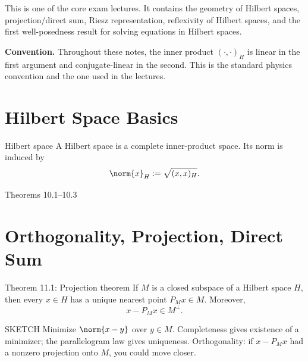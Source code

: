 \documentclass[header={Lecture 8 Exam Study Notes}]{study-note}
\begin{document}

\vspace{0.8em}

\begin{focusbox}
This is one of the core exam lectures. It contains the geometry of Hilbert spaces, projection/direct sum, Riesz representation, reflexivity of Hilbert spaces, and the first well-posedness result for solving equations in Hilbert spaces.

\medskip

\textbf{Convention.} Throughout these notes, the inner product $(\cdot,\cdot)_H$ is linear in the first argument and conjugate-linear in the second. This is the standard physics convention and the one used in the lectures.
\end{focusbox}

\tableofcontents

\section{Hilbert Space Basics}

\begin{defbox}{Hilbert space}
A Hilbert space is a complete inner-product space. Its norm is induced by
\[
\norm{x}_H:=\sqrt{(x,x)_H}.
\]
\end{defbox}

\begin{thmbox}{Theorems 10.1--10.3}
\thmInnerProductNorm

\medskip

\thmCauchySchwarz

\medskip

\thmParallelogram
\end{thmbox}

\section{Orthogonality, Projection, Direct Sum}

\begin{thmbox}{Theorem 11.1: Projection theorem}
If $M$ is a closed subspace of a Hilbert space $H$, then every $x\in H$ has a unique nearest point $P_Mx\in M$. Moreover,
\[
x-P_Mx\in M^\perp.
\]
\end{thmbox}

\begin{prooflevelbox}{SKETCH}
Minimize $\norm{x-y}$ over $y\in M$. Completeness gives existence of a minimizer; the parallelogram law gives uniqueness. Orthogonality: if $x-P_Mx$ had a nonzero projection onto $M$, you could move closer.
\end{prooflevelbox}
\end{document}
